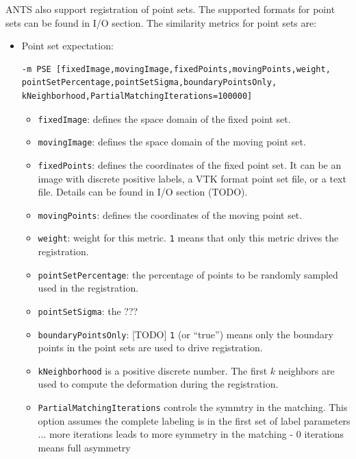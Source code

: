 ANTS also support registration of point sets. The supported formats for point sets can be found in I/O section. The similarity metrics for point sets are:
\begin{itemize}
    \item Point set expectation: 
     \begin{verbatim}
-m PSE [fixedImage,movingImage,fixedPoints,movingPoints,weight,
pointSetPercentage,pointSetSigma,boundaryPointsOnly,
kNeighborhood,PartialMatchingIterations=100000]
    \end{verbatim}
    \begin{itemize}
        \item \verb"fixedImage": defines the space domain of the fixed point set.
        \item \verb"movingImage": defines the space domain of the moving point set.
        \item \verb"fixedPoints": defines the coordinates of the fixed point set. It can be an image with discrete positive labels, a VTK format point set file, or a text file. Details can be found in I/O section (TODO).
        \item \verb"movingPoints": defines the coordinates of the moving point set.
        \item \verb"weight": weight for this metric. \verb"1" means that only this metric drives the registration.
        \item \verb"pointSetPercentage": the percentage of points to be randomly sampled used in the registration.
        \item \verb"pointSetSigma": the ??? 
        \item \verb"boundaryPointsOnly": [TODO] \verb"1" (or ``true'') means only the boundary points in the point sets are used to drive registration.
        \item \verb"kNeighborhood" is a positive discrete number. The first $k$ neighbors are used to compute the deformation during the registration. 
        \item \verb"PartialMatchingIterations" controls the symmtry in the matching. This option assumes the complete labeling is in the first set of label parameters ... more iterations leads to more symmetry in the matching  - 0 iterations means full asymmetry 
    \end{itemize}


\end{itemize}
